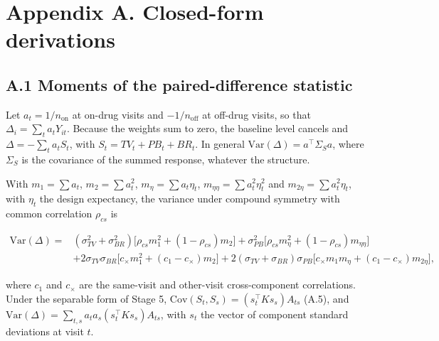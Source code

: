 \documentclass[
  11pt,
]{article}
\begin{document}
\newpage

\section*{Appendix A. Closed-form derivations}\label{appendix-a.-closed-form-derivations}

\subsection*{A.1 Moments of the paired-difference statistic}\label{a.1-moments-of-the-paired-difference-statistic}

Let \(a_t = 1/n_{\text{on}}\) at on-drug visits and \(-1/n_{\text{off}}\) at
off-drug visits, so that \(\Delta_i = \sum_t a_t Y_{it}\). Because the
weights sum to zero, the baseline level cancels and
\(\Delta = -\sum_t a_t S_t\), with \(S_t = TV_t + PB_t + BR_t\). In general
\(\mathrm{Var}(\Delta) = a^\top \Sigma_S a\), where \(\Sigma_S\) is the
covariance of the summed response, whatever the structure.

With \(m_1 = \sum a_t\), \(m_2 = \sum a_t^2\), \(m_\eta = \sum a_t \eta_t\),
\(m_{\eta\eta} = \sum a_t^2 \eta_t^2\) and \(m_{2\eta} = \sum a_t^2 \eta_t\),
with \(\eta_t\) the design expectancy, the variance under compound
symmetry with common correlation \(\rho_{cs}\) is

\[\begin{aligned}
\mathrm{Var}(\Delta) = {} & (\sigma_{TV}^2 + \sigma_{BR}^2)
  \big[\rho_{cs} m_1^2 + (1 - \rho_{cs}) m_2\big]
+ \sigma_{PB}^2 \big[\rho_{cs} m_\eta^2 + (1 - \rho_{cs}) m_{\eta\eta}\big] \\
& + 2\sigma_{TV}\sigma_{BR}\big[c_\times m_1^2 + (c_1 - c_\times) m_2\big]
+ 2(\sigma_{TV} + \sigma_{BR})\sigma_{PB}
  \big[c_\times m_1 m_\eta + (c_1 - c_\times) m_{2\eta}\big],
\end{aligned}\]

where \(c_1\) and \(c_\times\) are the same-visit and other-visit
cross-component correlations. Under the separable form of Stage 5,
\(\mathrm{Cov}(S_t, S_s) = (s_t^\top K s_s) A_{ts}\) (A.5), and
\(\mathrm{Var}(\Delta) = \sum_{t,s} a_t a_s (s_t^\top K s_s) A_{ts}\), with
\(s_t\) the vector of component standard deviations at visit \(t\).
\end{document}
